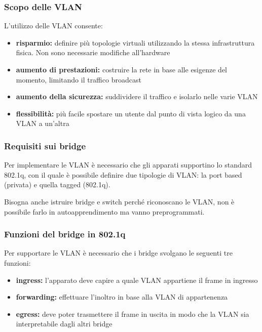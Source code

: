 \documentclass[
]{article}
\begin{document}
\hypertarget{header-n306}{%
\subsubsection{Scopo delle VLAN}\label{header-n306}}

L'utilizzo delle VLAN consente:

\begin{itemize}
\item
  \textbf{risparmio: }definire più topologie virtuali utilizzando la
  stessa infrastruttura fisica. Non sono necessarie modifiche
  all'hardware
\item
  \textbf{aumento di prestazioni: }costruire la rete in base alle
  esigenze del momento, limitando il traffico broadcast
\item
  \textbf{aumento della sicurezza: }suddividere il traffico e isolarlo
  nelle varie VLAN
\item
  \textbf{flessibilità: }più facile spostare un utente dal punto di
  vista logico da una VLAN a un'altra
\end{itemize}

\hypertarget{header-n317}{%
\subsubsection{Requisiti sui bridge}\label{header-n317}}

Per implementare le VLAN è necessario che gli apparati supportino lo
standard 802.1q, con il quale è possibile definire due tipologie di
VLAN: la port based (privata) e quella tagged (802.1q).

Bisogna anche istruire bridge e switch perché riconoscano le VLAN, non è
possibile farlo in autoapprendimento ma vanno preprogrammati.

\hypertarget{header-n320}{%
\subsubsection{Funzioni del bridge in 802.1q}\label{header-n320}}

Per supportare le VLAN è necessario che i bridge svolgano le seguenti
tre funzioni:

\begin{itemize}
\item
  \textbf{ingress: }l'apparato deve capire a quale VLAN appartiene il
  frame in ingresso
\item
  \textbf{forwarding: }effettuare l'inoltro in base alla VLAN di
  appartenenza
\item
  \textbf{egress: }deve poter trasmettere il frame in uscita in modo che
  la VLAN sia interpretabile dagli altri bridge
\end{itemize}
\end{document}
